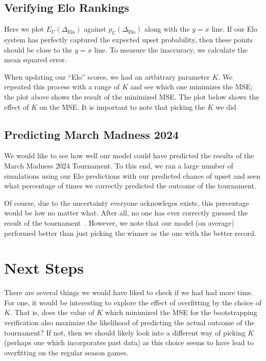 \documentclass{article}
\begin{document}
\subsection{Verifying Elo Rankings}
Here we plot $E_U(\Delta_{\text{Elo}})$ against $\hat{p}_U(\Delta_{\text{Elo}})$ along with the $y=x$ line. If our Elo system has perfectly captured the expected upset probability, then these points should be close to the $y=x$ line. To measure the inaccuracy, we calculate the mean squared error. 

When updating our ``Elo'' scores, we had an artbitrary parameter $K$. We repeated this process with a range of $K$ and see which one minimizes the MSE; the plot above shows the result of the minimized MSE. The plot below shows the effect of $K$ on the MSE. It is important to note that picking the $K$ we did 

\subsection{Predicting March Madness 2024}
We would like to see how well our model could have predicted the results of the March Madness 2024 Tournament. To this end, we ran a large number of simulations using our Elo predictions with our predicted chance of upset and seen what percentage of times we correctly predicted the outcome of the tournament.

Of course, due to the uncertainty everyone acknowleges exists, this percentage would be low no matter what. After all, no one has ever correctly guessed the result of the tournament~\cite{cbsnewsAnyoneEver}. However, we note that our model (on average) performed better than just picking the winner as the one with the better record.

\section{Next Steps}
There are several things we would have liked to check if we had had more time. For one, it would be interesting to explore the effect of overfitting by the choice of $K$. That is, does the value of $K$ which minimized the MSE for the bootstrapping verification also maximize the likelihood of predicting the actual outcome of the tournament? If not, then we should likely look into a different way of picking $K$ (perhaps one which incorporates past data) as this choice seems to have lead to overfitting on the regular season games.
\end{document}
